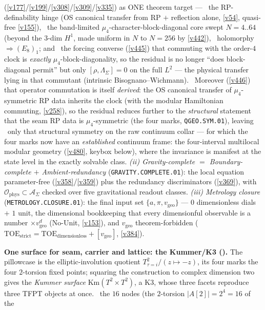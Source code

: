 \documentclass[11pt,a4paper]{article}
\begin{document}
\begin{keybox}
(\vref{v177}/\vref{v199}/\vref{v308}/\vref{v309}/\vref{v335}) as ONE theorem target --- \mE\ the RP-definability
hinge (OS canonical transfer from RP $+$ reflection alone, \vref{v54}, quasi-free \vref{v155}), \mE\ the band-limited
$\mu_4$-character-block-diagonal core swept $N{=}4..64$ (beyond the $3$-dim $H^1$, made uniform in $N$ to $N{=}256$
by \vref{v442}), \mE\ holomorphy $\Rightarrow(E_8)_1$; and \mE\ the forcing converse (\vref{v445}) that commuting with
the order-$4$ clock is \emph{exactly} $\mu_4$-block-diagonality, so the residual is no longer ``does block-diagonal
permit'' but only $[\rho,\Lambda_\Sigma]{=}0$ on the full $L^2$ --- the physical transfer lying in that
commutant (intrinsic Bisognano--Wichmann). \mE\ Moreover (\vref{v446}) that operator commutation is itself
\emph{derived}: the OS canonical transfer of $\mu_4$-symmetric RP data inherits the clock (with the modular
Hamiltonian commuting, \vref{v258}), so the residual reduces further to the \emph{structural} statement that the
seam RP data is $\mu_4$-symmetric (the four marks, \texttt{QGEO.SYM.01}), leaving \mO\ only that structural
symmetry on the raw continuum collar --- for which the four marks now have an \emph{established} continuum frame:
the four-interval multilocal modular geometry (\vref{v480}, keybox below), where the invariance is manifest at the
state level in the exactly solvable class.
\emph{(ii) Gravity-complete $=$ Boundary-complete $+$ Ambient-redundancy} (\texttt{GRAVITY.COMPLETE.01}): the local
equation parameter-free (\vref{v358}/\vref{v359}) plus the redundancy discriminators (\vref{v369}), with
$\mathcal O_{\mathrm{phys}}\subset\mathcal A_\Sigma$ checked over five gravitational readout classes.
\emph{(iii) Metrology closure} (\texttt{METROLOGY.CLOSURE.01}): the final input set $\{a,\pi,v_{\mathrm{geo}}\}$ ---
$0$ dimensionless dials $+$ $1$ unit, the dimensional bookkeeping that every dimensionful observable is a number
$\times v_{\mathrm{geo}}^d$ (No-Unit, \vref{v153}), and $v_{\mathrm{geo}}$ theorem-forbidden
($\mathrm{TOE}_{\mathrm{strict}}{=}\mathrm{TOE}_{\mathrm{dimensionless}}{+}[v_{\mathrm{geo}}]$, \vref{v384}).
\par\smallskip\noindent\textbf{One surface for seam, carrier and lattice: the Kummer/K3
().} The pillowcase is the elliptic-involution quotient
$T^2_{\tau=i}/(z{\mapsto}{-}z)$, its four marks the four $2$-torsion fixed points; squaring the construction
to complex dimension two gives the \emph{Kummer surface} $\mathrm{Km}(T^2{\times}T^2)$, a K3, whose three
facets reproduce three TFPT objects at once. \mE\ the $16$ nodes (the $2$-torsion $|A[2]|{=}2^4{=}16$ of the

\end{keybox}
\end{document}
